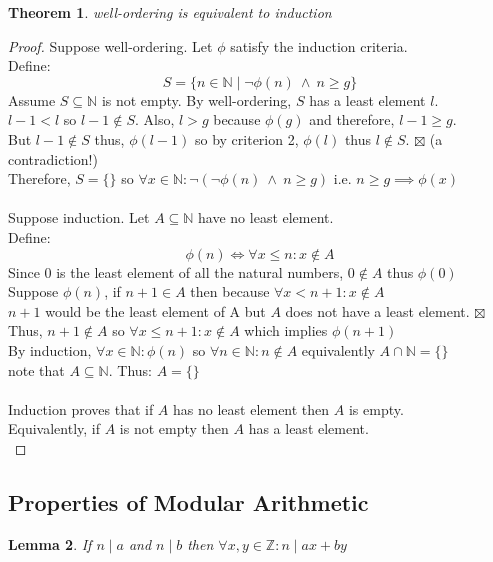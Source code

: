 \documentclass[12pt]{extarticle}
\newcommand{\cont}{$\boxtimes$}
\newcommand{\divides}{\mid}
\newcommand{\Z}{\mathbb{Z}}
\newcommand{\N}{\mathbb{N}}
\newtheorem{theorem}{Theorem}[section]
\newtheorem{lemma}[theorem]{Lemma}
\begin{document}
\begin{theorem}
\label{oderingisinduction}
well-ordering is equivalent to induction
\end{theorem}
\begin{proof} Suppose well-ordering. Let $\phi$ satisfy the induction criteria.\\
Define: \[S = \{n \in \N \mid \neg \phi (n) \: \wedge \: n \ge g\}\] Assume $S \subseteq \N$ is not empty. By well-ordering,
$S$ has a least element $l$. \\ $l-1 < l$ so $l-1 \notin S$. Also, $l > g$ because $\phi (g)$ and therefore, $l-1 \ge g$. \\
But $l-1 \notin S$ thus, $\phi (l-1)$ so by criterion 2, $\phi (l)$ thus $l \notin S$. \cont \: (a contradiction!) \\ Therefore, $S = \{\}$ so $\forall x \in \N : \neg (\neg \phi (n) \: \wedge \: n \ge g)$ i.e. $n \ge g \implies \phi (x)$
\\\\
Suppose induction. Let $A \subseteq \N$ have no least element.\\
Define: \[\phi (n) \iff \forall x \le n : x \notin A\] 
Since $0$ is the least element of all the natural numbers, $0 \notin A$ thus $\phi (0)$\\
Suppose $\phi (n)$, if $n+1 \in A$ then because $\forall x < n+1 : x \notin A$\\
$n+1$ would be the least element of A but $A$ does not have a least element. \cont  \\
Thus, $n+1 \notin A$ so $\forall x \le n+1 : x \notin A$ which implies $\phi (n+1)$\\
By induction, $\forall x \in \N : \phi (n)$ so $\forall n \in \N : n \notin A$ equivalently $A \cap \N = \{\}$\\
note that $A \subseteq \N$. Thus: $A = \{\}$\\\\
Induction proves that if $A$ has no least element then $A$ is empty.\\
Equivalently, if $A$ is not empty then $A$ has a least element.\\
\end{proof}

\subsection{Properties of Modular Arithmetic}

\begin{lemma} If $n \divides a$ and $n \divides b$ then $\forall x,y \in \Z: n \divides ax+by$ 
\end{lemma}
\end{document}
